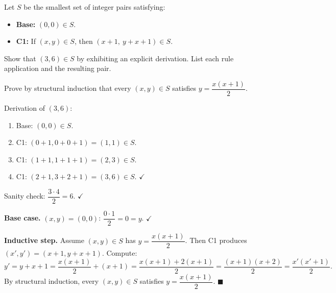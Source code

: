 \documentclass[test,letterpaper]{cs20}
\begin{document}
\begin{problem}

Let $S$ be the smallest set of integer pairs satisfying:
\begin{itemize}
\item \textbf{Base:} $(0, 0) \in S$.
\item \textbf{C1:} If $(x, y) \in S$, then $(x + 1,\ y + x + 1) \in S$.
\end{itemize}

\subproblem Show that $(3, 6) \in S$ by exhibiting an explicit derivation. List each rule application and the resulting pair.

\subproblem Prove by structural induction that every $(x, y) \in S$ satisfies $y = \dfrac{x(x+1)}{2}$.

\begin{solution}
\subsolution Derivation of $(3, 6)$:
\begin{enumerate}
\item Base: $(0, 0) \in S$.
\item C1: $(0 + 1, 0 + 0 + 1) = (1, 1) \in S$.
\item C1: $(1 + 1, 1 + 1 + 1) = (2, 3) \in S$.
\item C1: $(2 + 1, 3 + 2 + 1) = (3, 6) \in S$. $\checkmark$
\end{enumerate}
Sanity check: $\dfrac{3 \cdot 4}{2} = 6$. $\checkmark$

\subsolution \textbf{Base case.} $(x, y) = (0, 0)$: $\dfrac{0 \cdot 1}{2} = 0 = y$. $\checkmark$

\textbf{Inductive step.} Assume $(x, y) \in S$ has $y = \dfrac{x(x+1)}{2}$. Then C1 produces $(x', y') = (x + 1, y + x + 1)$. Compute:
\[
y' = y + x + 1 = \frac{x(x+1)}{2} + (x + 1) = \frac{x(x+1) + 2(x+1)}{2} = \frac{(x+1)(x+2)}{2} = \frac{x'(x'+1)}{2}.
\]
By structural induction, every $(x, y) \in S$ satisfies $y = \dfrac{x(x+1)}{2}$. $\blacksquare$
\end{solution}

\pagebreak

\end{problem}
\end{document}
